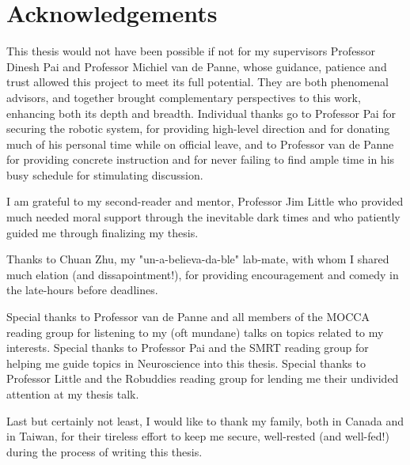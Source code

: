 \chapter{Acknowledgements}      %
This thesis would not have been possible if not for my supervisors Professor Dinesh Pai and Professor Michiel van de Panne, whose guidance, patience and trust allowed this project to meet its full potential. 
They are both phenomenal advisors, and together brought complementary perspectives to this work, enhancing both its depth and breadth. 
Individual thanks go to Professor Pai for securing the robotic system, for providing high-level direction and for donating much of his personal time while on official leave, and to Professor van de Panne for providing concrete instruction and for never failing to find ample time in his busy schedule for stimulating discussion.

I am grateful to my second-reader and mentor, Professor Jim Little who provided much needed moral support through the inevitable dark times and who patiently guided me through finalizing my thesis.

Thanks to Chuan Zhu, my "un-a-believa-da-ble" lab-mate, with whom I shared much elation (and dissapointment!), for providing encouragement and comedy in the late-hours before deadlines. 

Special thanks to Professor van de Panne and all members of the MOCCA reading group for listening to my (oft mundane) talks on topics related to my interests. Special thanks to Professor Pai and the SMRT reading group for helping me guide topics in Neuroscience into this thesis. Special thanks to Professor Little and the Robuddies reading group for lending me their undivided attention at my thesis talk.

Last but certainly not least, I would like to thank my family, both in Canada and in Taiwan, for their tireless effort to keep me secure, well-rested (and well-fed!) during the process of writing this thesis.
